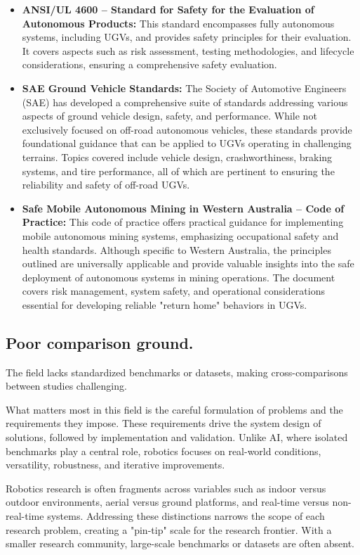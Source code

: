 \documentclass[runningheads]{llncs}
\begin{document}
\begin{itemize}
  \item \textbf{ANSI/UL 4600 – Standard for Safety for the Evaluation of Autonomous Products:} This standard encompasses fully autonomous systems, including UGVs, and provides safety principles for their evaluation. It covers aspects such as risk assessment, testing methodologies, and lifecycle considerations, ensuring a comprehensive safety evaluation.

  \item \textbf{SAE Ground Vehicle Standards:} The Society of Automotive Engineers (SAE) has developed a comprehensive suite of standards addressing various aspects of ground vehicle design, safety, and performance. While not exclusively focused on off-road autonomous vehicles, these standards provide foundational guidance that can be applied to UGVs operating in challenging terrains. Topics covered include vehicle design, crashworthiness, braking systems, and tire performance, all of which are pertinent to ensuring the reliability and safety of off-road UGVs.

  \item \textbf{Safe Mobile Autonomous Mining in Western Australia – Code of Practice:} This code of practice offers practical guidance for implementing mobile autonomous mining systems, emphasizing occupational safety and health standards. Although specific to Western Australia, the principles outlined are universally applicable and provide valuable insights into the safe deployment of autonomous systems in mining operations. The document covers risk management, system safety, and operational considerations essential for developing reliable "return home" behaviors in UGVs.

\end{itemize}


\subsection{Poor comparison ground.} The field lacks standardized benchmarks or datasets, making cross-comparisons between studies challenging.

  What matters most in this field is the careful formulation of problems and the requirements they impose. These requirements drive the system design of solutions, followed by implementation and validation. Unlike AI, where isolated benchmarks play a central role, robotics focuses on real-world conditions, versatility, robustness, and iterative improvements.

  Robotics research is often fragments across variables such as indoor versus outdoor environments, aerial versus ground platforms, and real-time versus non-real-time systems. Addressing these distinctions narrows the scope of each research problem, creating a "pin-tip" scale for the research frontier. With a smaller research community, large-scale benchmarks or datasets are often absent.
\end{document}
